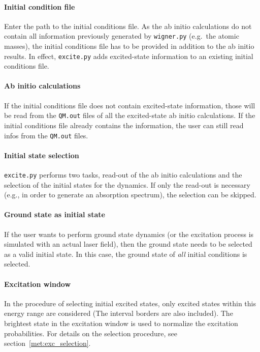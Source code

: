 \documentclass[a4paper,11pt,DIV=15,openany,twoside=false]{scrbook}
\newcommand{\ttt}[1]{\texttt{#1}}
\begin{document}
\paragraph{Initial condition file}

Enter the path to the initial conditions file. As the ab initio calculations do not contain all information previously generated by \ttt{wigner.py} (e.g.\ the atomic masses), the initial conditions file has to be provided in addition to the ab initio results. In effect, \ttt{excite.py} adds excited-state information to an existing initial conditions file.

\paragraph{Ab initio calculations}

If the initial conditions file does not contain excited-state information, those will be read from the \ttt{QM.out} files of all the excited-state ab initio calculations. If the initial conditions file already contains the information, the user can still read infos from the \ttt{QM.out} files.

\paragraph{Initial state selection}

\ttt{excite.py} performs two tasks, read-out of the ab initio calculations and the selection of the initial states for the dynamics. If only the read-out is necessary (e.g., in order to generate an absorption spectrum), the selection can be skipped.

\paragraph{Ground state as initial state}

If the user wants to perform ground state dynamics (or the excitation process is simulated with an actual laser field), then the ground state needs to be selected as a valid initial state. In this case, the ground state of \textit{all} initial conditions is selected.

\paragraph{Excitation window}

In the procedure of selecting initial excited states, only excited states within this energy range are considered (The interval borders are also included). The brightest state in the excitation window is used to normalize the excitation probabilities. For details on the selection procedure, see section~\ref{met:exc_selection}. 
\end{document}
